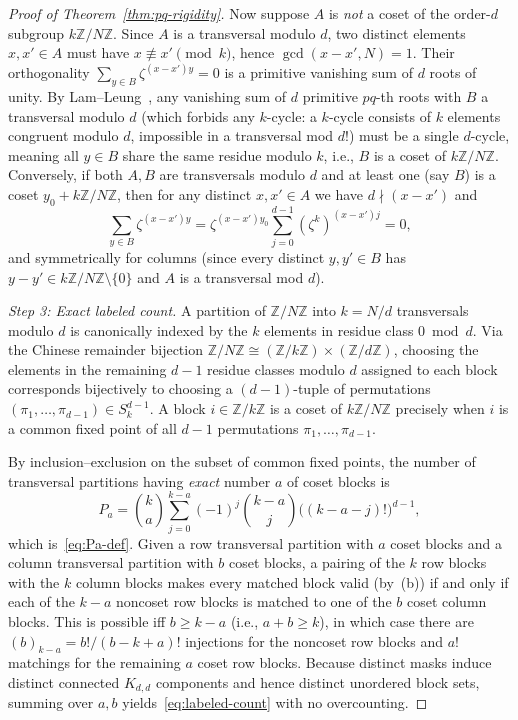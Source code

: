 \documentclass[11pt,reqno]{amsart}
\numberwithin{equation}{section}
\theoremstyle{definition}
\theoremstyle{remark}
\newcommand{\Z}{\mathbb{Z}}
\begin{document}
\begin{proof}[Proof of Theorem~\ref{thm:pq-rigidity}]
Now suppose $A$ is \emph{not} a coset of the order-$d$ subgroup $k\Z/N\Z$. Since $A$ is a transversal modulo $d$, two distinct elements $x,x'\in A$ must have $x\not\equiv x'\pmod k$, hence $\gcd(x-x',N)=1$. Their orthogonality $\sum_{y\in B}\zeta^{(x-x')y}=0$ is a primitive vanishing sum of $d$ roots of unity. By Lam--Leung~\cite[Theorem~3.3]{LL00}, any vanishing sum of $d$ primitive $pq$-th roots with $B$ a transversal modulo $d$ (which forbids any $k$-cycle: a $k$-cycle consists of $k$ elements congruent modulo $d$, impossible in a transversal mod $d$!) must be a single $d$-cycle, meaning all $y\in B$ share the same residue modulo $k$, i.e., $B$ is a coset of $k\Z/N\Z$. Conversely, if both $A,B$ are transversals modulo $d$ and at least one (say $B$) is a coset $y_0 + k\Z/N\Z$, then for any distinct $x,x'\in A$ we have $d\nmid (x-x')$ and
\[
\sum_{y\in B}\zeta^{(x-x')y} = \zeta^{(x-x')y_0}\sum_{j=0}^{d-1}(\zeta^k)^{(x-x')j} = 0,
\]
and symmetrically for columns (since every distinct $y,y'\in B$ has $y-y'\in k\Z/N\Z\setminus\{0\}$ and $A$ is a transversal mod $d$).

\smallskip
\noindent\emph{Step 3: Exact labeled count.}
A partition of $\Z/N\Z$ into $k=N/d$ transversals modulo $d$ is canonically indexed by the $k$ elements in residue class $0\bmod d$. Via the Chinese remainder bijection $\Z/N\Z \cong (\Z/k\Z)\times(\Z/d\Z)$, choosing the elements in the remaining $d-1$ residue classes modulo $d$ assigned to each block corresponds bijectively to choosing a $(d-1)$-tuple of permutations $(\pi_1,\ldots,\pi_{d-1})\in S_k^{d-1}$. A block $i\in\Z/k\Z$ is a coset of $k\Z/N\Z$ precisely when $i$ is a common fixed point of all $d-1$ permutations $\pi_1,\ldots,\pi_{d-1}$.

By inclusion--exclusion on the subset of common fixed points, the number of transversal partitions having \emph{exact} number $a$ of coset blocks is
\[
P_a = \binom{k}{a}\sum_{j=0}^{k-a}(-1)^j\binom{k-a}{j}\bigl((k-a-j)!\bigr)^{d-1},
\]
which is~\eqref{eq:Pa-def}. Given a row transversal partition with $a$ coset blocks and a column transversal partition with $b$ coset blocks, a pairing of the $k$ row blocks with the $k$ column blocks makes every matched block valid (by~(b)) if and only if each of the $k-a$ noncoset row blocks is matched to one of the $b$ coset column blocks. This is possible iff $b\ge k-a$ (i.e., $a+b\ge k$), in which case there are $(b)_{k-a}=b!/(b-k+a)!$ injections for the noncoset row blocks and $a!$ matchings for the remaining $a$ coset row blocks. Because distinct masks induce distinct connected $K_{d,d}$ components and hence distinct unordered block sets, summing over $a,b$ yields~\eqref{eq:labeled-count} with no overcounting.
\end{proof}
\end{document}
